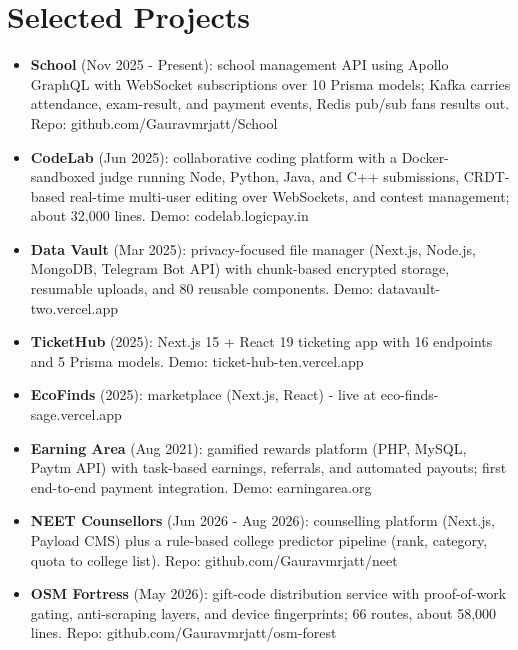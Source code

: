 \documentclass[11pt,a4paper,sans]{moderncv}
\begin{document}
\section{Selected Projects}
\vspace{1pt}
\begin{itemize}
    \item {\textbf{School} (Nov 2025 - Present): school management API using Apollo GraphQL with WebSocket subscriptions over 10 Prisma models; Kafka carries attendance, exam-result, and payment events, Redis pub/sub fans results out. Repo: github.com/Gauravmrjatt/School}
    \item {\textbf{CodeLab} (Jun 2025): collaborative coding platform with a Docker-sandboxed judge running Node, Python, Java, and C++ submissions, CRDT-based real-time multi-user editing over WebSockets, and contest management; about 32,000 lines. Demo: codelab.logicpay.in}
    \item {\textbf{Data Vault} (Mar 2025): privacy-focused file manager (Next.js, Node.js, MongoDB, Telegram Bot API) with chunk-based encrypted storage, resumable uploads, and 80 reusable components. Demo: datavault-two.vercel.app}
    \item {\textbf{TicketHub} (2025): Next.js 15 + React 19 ticketing app with 16 endpoints and 5 Prisma models. Demo: ticket-hub-ten.vercel.app}
    \item {\textbf{EcoFinds} (2025): marketplace (Next.js, React) - live at eco-finds-sage.vercel.app}
    \item {\textbf{Earning Area} (Aug 2021): gamified rewards platform (PHP, MySQL, Paytm API) with task-based earnings, referrals, and automated payouts; first end-to-end payment integration. Demo: earningarea.org}
    \item {\textbf{NEET Counsellors} (Jun 2026 - Aug 2026): counselling platform (Next.js, Payload CMS) plus a rule-based college predictor pipeline (rank, category, quota to college list). Repo: github.com/Gauravmrjatt/neet}
    \item {\textbf{OSM Fortress} (May 2026): gift-code distribution service with proof-of-work gating, anti-scraping layers, and device fingerprints; 66 routes, about 58,000 lines. Repo: github.com/Gauravmrjatt/osm-forest}
\end{itemize}

\end{document}
